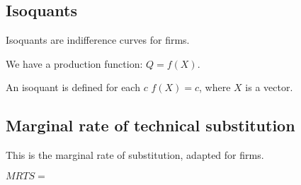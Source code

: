 
\subsection{Isoquants}

Isoquants are indifference curves for firms.

We have a production function: \(Q=f(X)\).

An isoquant is defined for each \(c\) \(f(X)=c\), where \(X\) is a vector.

\subsection{Marginal rate of technical substitution}

This is the marginal rate of substitution, adapted for firms.

\(MRTS=\)

